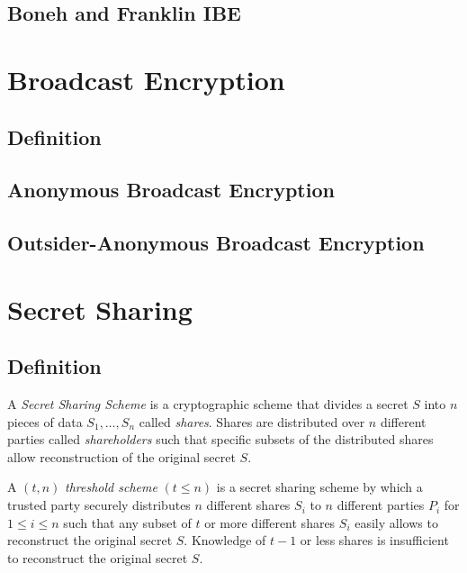 \subsection{Boneh and Franklin IBE}

\section{Broadcast Encryption}

\subsection{Definition}

\subsection{Anonymous Broadcast Encryption}

\subsection{Outsider-Anonymous Broadcast Encryption}


\section{Secret Sharing}

\subsection{Definition}
\begin{defn}
\label{def:secret_sharing_scheme}
 A \textit{Secret Sharing Scheme} is a cryptographic scheme that divides a secret $S$ into $n$ pieces of data $S_1, \ldots, S_n$ called \textit{shares}. Shares are distributed over $n$ different parties called \textit{shareholders} such that specific subsets of the distributed shares allow reconstruction of the original secret $S$.
\end{defn}

\begin{defn}
\label{def:threshold_scheme}
 A $\left( t, n \right)$ \textit{threshold scheme} $\left( t \leq n \right)$ is a secret sharing scheme by which a trusted party securely distributes $n$ different shares $S_i$ to $n$ different parties $P_i$ for $1 \leq i \leq n$ such that any subset of $t$ or more different shares $S_i$ easily allows to reconstruct the original secret $S$. Knowledge of $t-1$ or less shares is insufficient to reconstruct the original secret $S$.
\end{defn}

